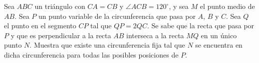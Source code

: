 Sea $ABC$ un triángulo con $CA = CB$ y $\angle ACB = 120^{\circ}$, y sea $M$ el punto medio
de $AB$. Sea $P$ un punto variable de la circunferencia que pasa por $A$, $B$ y $C$. Sea $Q$ el punto en el
segmento $CP$ tal que $QP = 2 QC$. Se sabe que la recta que pasa por $P$ y que es perpendicular a la recta
$AB$ interseca a la recta $MQ$ en un único punto $N $.
Muestra que existe una circunferencia fija tal que $N$ se encuentra en dicha circunferencia para
todas las posibles posiciones de $P$.